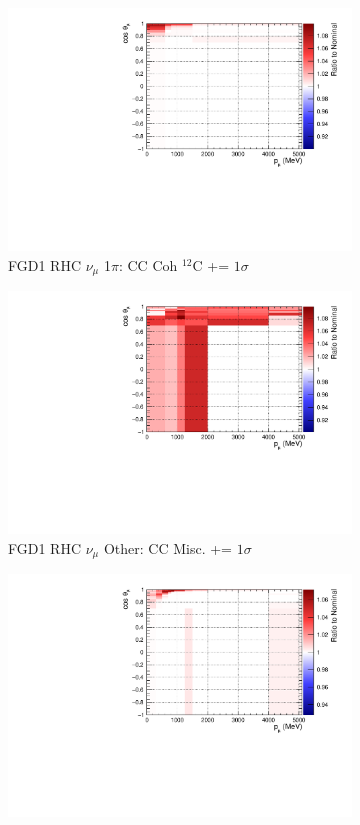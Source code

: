 \begin{figure}[!htbp]
\begin{subfigure}{.32\textwidth}
  \includegraphics[width=0.85\linewidth]{figs/sig/FGD1_NuMuBkg_CC1pi_in_AntiNu_Mode_CC_Coh_C_+1sig.pdf}
  \caption{FGD1 RHC $\nu_{\mu}$ 1$\pi$: CC Coh $^{12}$C += $1\sigma$}
  \label{fig:sigvar_FGD1_NuMuBkg_CC1pi_in_AntiNu_Mode}
\end{subfigure}
\begin{subfigure}{.32\textwidth}
  \centering
  \includegraphics[width=0.85\linewidth]{figs/sig/FGD1_NuMuBkg_CCOther_in_AntiNu_Mode_CC_Misc_+1sig.pdf}
  \caption{FGD1 RHC $\nu_{\mu}$ Other: CC Misc. += $1\sigma$}
  \label{fig:sigvar_FGD1_NuMuBkg_CCOther_in_AntiNu_Mode}
\end{subfigure}
\begin{subfigure}{.32\textwidth}
  \centering
  \includegraphics[width=0.85\linewidth]{figs/sig/FGD2_NuMuBkg_CC0pi_in_AntiNu_Mode_Q2_norm_0_+1sig.pdf}

\end{subfigure}
\end{figure}
